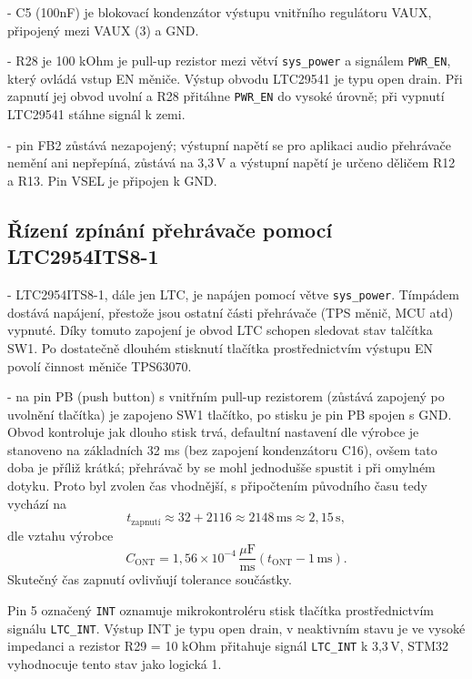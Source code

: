 - C5 (100nF) je blokovací kondenzátor výstupu vnitřního regulátoru VAUX, připojený mezi VAUX (3) a GND.

- R28 je 100 kOhm je pull-up rezistor mezi větví \texttt{sys\_power} a signálem \texttt{PWR\_EN}, který ovládá vstup EN měniče. Výstup obvodu LTC29541 je typu open drain. Při zapnutí jej obvod uvolní a R28 přitáhne \texttt{PWR\_EN} do vysoké úrovně; při vypnutí LTC29541 stáhne signál k zemi. 

- pin FB2 zůstává nezapojený; výstupní napětí se pro aplikaci audio přehrávače nemění ani nepřepíná, zůstává na 3,3\,V a výstupní napětí je určeno děličem R12 a R13. Pin VSEL je připojen k GND.



\subsection{Řízení zpínání přehrávače pomocí LTC2954ITS8-1}
\label{teorie_LTC2954ITS8-1}

- LTC2954ITS8-1, dále jen LTC, je napájen pomocí větve \texttt{sys\_power}. Tímpádem dostává napájení, přestože jsou ostatní části přehrávače (TPS měnič, MCU atd) vypnuté. Díky tomuto zapojení je obvod LTC schopen sledovat stav talčítka SW1. Po dostatečně dlouhém stisknutí tlačítka prostřednictvím výstupu EN povolí činnost měniče TPS63070.

- na pin PB (push button) s vnitřním pull-up rezistorem (zůstává zapojený po uvolnění tlačítka) je zapojeno SW1 tlačítko, po stisku je pin PB spojen s GND. Obvod kontroluje jak dlouho stisk trvá, defaultní nastavení dle výrobce je stanoveno na základních 32 ms (bez zapojení kondenzátoru C16), ovšem tato doba je příliž krátká; přehrávač by se mohl jednodušše spustit i při omylném dotyku. Proto byl zvolen čas vhodnější, s připočtením původního času tedy vychází na \[
t_{\mathrm{zapnutí}}
\approx32+2116
\approx2148\,\mathrm{ms}
\approx2{,}15\,\mathrm{s},
\] dle vztahu výrobce \[
C_{\mathrm{ONT}}
=1{,}56\times10^{-4}\,\frac{\mu\mathrm{F}}{\mathrm{ms}}
\left(t_{\mathrm{ONT}}-1\,\mathrm{ms}\right).
\]
Skutečný čas zapnutí ovlivňují tolerance součástky.

Pin 5 označený \texttt{INT} oznamuje mikrokontroléru stisk tlačítka prostřednictvím signálu \texttt{LTC\_INT}. Výstup INT je typu open drain, v neaktivním stavu je ve vysoké impedanci a rezistor R29 = 10 kOhm přitahuje signál \texttt{LTC\_INT} k 3,3\,V, STM32 vyhodnocuje tento stav jako logická 1. 

